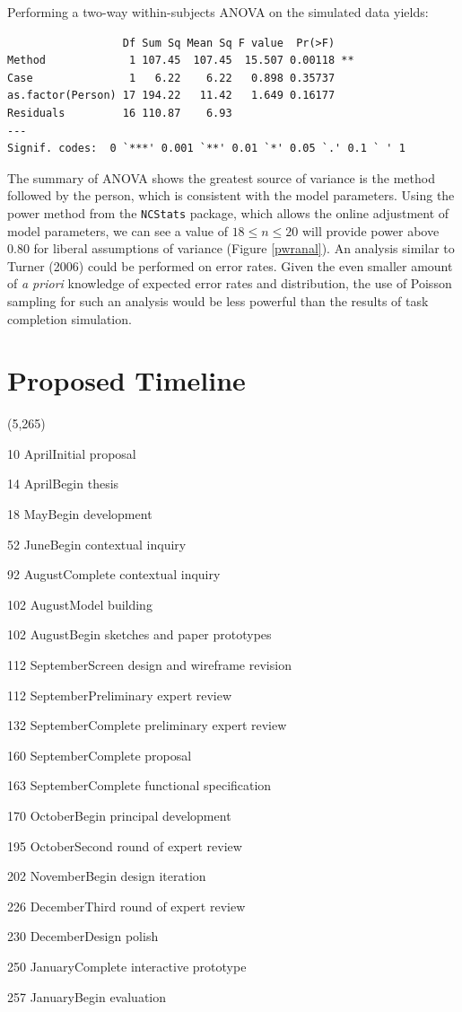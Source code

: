 \documentclass[11pt]{article}
\begin{document}
Performing a two-way within-subjects ANOVA on the simulated data yields: 
\begin{verbatim}
                  Df Sum Sq Mean Sq F value  Pr(>F)   
Method             1 107.45  107.45  15.507 0.00118 **
Case               1   6.22    6.22   0.898 0.35737   
as.factor(Person) 17 194.22   11.42   1.649 0.16177   
Residuals         16 110.87    6.93                   
---
Signif. codes:  0 `***' 0.001 `**' 0.01 `*' 0.05 `.' 0.1 ` ' 1 
\end{verbatim}
The summary of ANOVA shows the greatest source of variance is the method followed by the person, which is consistent with the model parameters. Using the power method from the \texttt{NCStats} package, which allows the online adjustment of model parameters, we can see a value of $18 \le n \le 20$ will provide power above 0.80 for liberal assumptions of variance (Figure \ref{pwranal}). An analysis similar to Turner (2006) could be performed on error rates. Given the even smaller amount of \textit{a priori} knowledge of expected error rates and distribution, the use of Poisson sampling for such an analysis would be less powerful than the results of task completion simulation.

\section{Proposed Timeline}

\begin{timeline}{4.2in}(5,265)
\optrule
  \item[10]{April}{Initial proposal}
  \item[14]{April}{Begin thesis}
  \item[18]{May}{Begin development}
  \item[52]{June}{Begin contextual inquiry}
  \item[92]{August}{Complete contextual inquiry}
  \item[102]{August}{Model building}
  \item[102]{August}{Begin sketches and paper prototypes}
  \item[112]{September}{Screen design and wireframe revision}
  \item[112]{September}{Preliminary expert review}
  \item[132]{September}{Complete preliminary expert review}
  \item[160]{September}{Complete proposal}
  \item[163]{September}{Complete functional specification}
  \item[170]{October}{Begin principal development}
  \item[195]{October}{Second round of expert review}
  \item[202]{November}{Begin design iteration}
  \item[226]{December}{Third round of expert review}
  \item[230]{December}{Design polish}
  \item[250]{January}{Complete interactive prototype}
  \item[257]{January}{Begin evaluation}
\end{timeline}%
\end{document}
